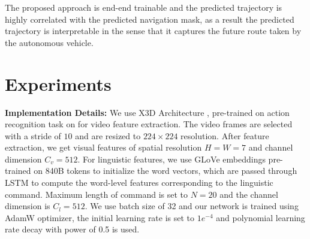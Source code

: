 \documentclass[11pt]{article}
\begin{document}
The proposed approach is end-end trainable and the predicted trajectory is highly correlated with the predicted navigation mask, as a result the predicted trajectory is interpretable in the sense that it captures the future route taken by the autonomous vehicle.





\section{Experiments}

\textbf{Implementation Details: }We use X3D Architecture \cite{feichtenhofer2020x3d}, pre-trained on action recognition task on \cite{kay2017kinetics} for video feature extraction. The video frames are selected with a stride of $10$ and are resized to $224 \times 224$ resolution. After feature extraction, we get visual features of spatial resolution $H=W=7$ and channel dimension $C_v=512$. For linguistic features, we use GLoVe embeddings pre-trained on 840B tokens to initialize the word vectors, which are passed through LSTM to compute the word-level features corresponding to the linguistic command. Maximum length of command is set to $N=20$ and the channel dimension is $C_l=512$. We use batch size of 32 and our network is trained using AdamW optimizer, the initial learning rate is set to $1e^{-4}$ and polynomial learning rate decay with power of 0.5 is used.
\end{document}
